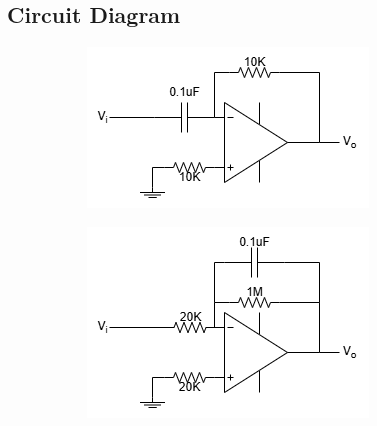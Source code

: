     \subsection{Circuit Diagram}
    \begin{figure}[h]

        \begin{subfigure}[h]{0.47\textwidth}
        \begin{center}
            \includegraphics[width=1\linewidth]{Lab11/Lab11a.drawio.png}
            \caption{}
            \label{L11a}
        \end{center} 
        \end{subfigure}
    \hfill
    \vspace{0.2 cm}
        \begin{subfigure}[h]{0.47\textwidth}
        \begin{center}
            \includegraphics[width=1\linewidth]{Lab11/Lab11b.drawio.png}
            \caption{}
            \label{L11b}
        \end{center}
        \end{subfigure}
    \vfill
    

\end{figure}
